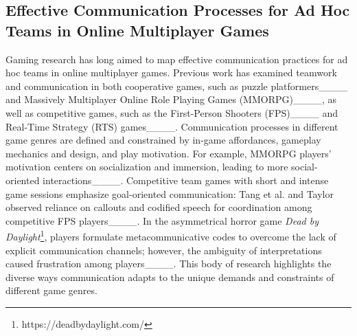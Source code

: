 \subsection{Effective Communication Processes for Ad Hoc Teams in Online Multiplayer Games}

Gaming research has long aimed to map effective communication practices for ad hoc teams in online multiplayer games. Previous work has examined teamwork and communication in both cooperative games, such as puzzle platformers____ and Massively Multiplayer Online Role Playing Games (MMORPG)____, as well as competitive games, such as the First-Person Shooters (FPS)____ and Real-Time Strategy (RTS) games____. Communication processes in different game genres are defined and constrained by in-game affordances, gameplay mechanics and design, and play motivation. For example, MMORPG players' motivation centers on socialization and immersion, leading to more social-oriented interactions____. Competitive team games with short and intense game sessions emphasize goal-oriented communication: Tang et al. and Taylor observed reliance on callouts and codified speech for coordination among competitive FPS players____. In the asymmetrical horror game \textit{Dead by Daylight}\footnote{https://deadbydaylight.com/}, players formulate metacommunicative codes to overcome the lack of explicit communication channels; however, the ambiguity of interpretations caused frustration among players____. This body of research highlights the diverse ways communication adapts to the unique demands and constraints of different game genres. 

